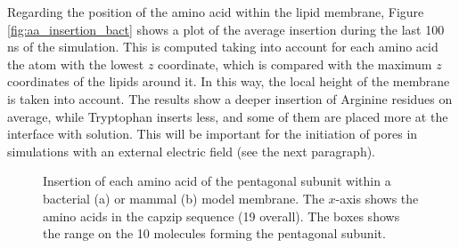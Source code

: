 Regarding the position of the amino acid within the lipid membrane, Figure \ref{fig:aa_insertion_bact} shows a plot of the average insertion during the last 100 ns of the simulation. This is computed taking into account for each amino acid the atom with the lowest $z$ coordinate, which is compared with the maximum $z$ coordinates of the lipids around it. In this way, the local height of the membrane is taken into account. The results show a deeper insertion of Arginine residues on average, while Tryptophan inserts less, and some of them are placed more at the interface with solution. This will be important for the initiation of pores in simulations with an external electric field (see the next paragraph).
%
\begin{figure}[t!]
\centering
{}
\caption[Insertion of capzip amino acid in model membranes (atomistic)]{Insertion of each amino acid of the pentagonal subunit within a bacterial (a) or mammal (b) model membrane. The $x$-axis shows the amino acids in the capzip sequence (19 overall). The boxes shows the range on the 10 molecules forming the pentagonal subunit.}
\label{fig:aa_insertion}
\end{figure}

